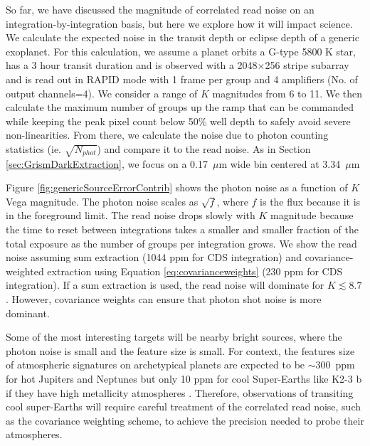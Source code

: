 \documentclass[]{aastex62}
\begin{document}
So far, we have discussed the magnitude of correlated read noise on an integration-by-integration basis, but here we explore how it will impact science.
We calculate the expected noise in the transit depth or eclipse depth of a generic exoplanet.
For this calculation, we assume a planet orbits a G-type 5800 K star, has a 3 hour transit duration and is observed with a 2048$\times$256 stripe subarray and is read out in RAPID mode with 1 frame per group and 4 amplifiers (No. of output channels=4).
We consider a range of $K$ magnitudes from 6 to 11.
We then calculate the maximum number of groups up the ramp that can be commanded while keeping the peak pixel count below 50\% well depth to safely avoid severe non-linearities.
From there, we calculate the noise due to photon counting statistics (ie. $\sqrt{N_{phot}}$) and compare it to the read noise.
As in Section \ref{sec:GrismDarkExtraction}, we focus on a 0.17~$\mu$m wide bin centered at 3.34~$\mu$m

Figure \ref{fig:genericSourceErrorContrib} shows the photon noise as a function of $K$ Vega magnitude.
The photon noise scales as $\sqrt{f}$, where $f$ is the flux because it is in the foreground limit.
The read noise drops slowly with $K$ magnitude because the time to reset between integrations takes a smaller and smaller fraction of the total exposure as the number of groups per integration grows.
We show the read noise assuming sum extraction (1044 ppm for CDS integration) and covariance-weighted extraction using Equation \ref{eq:covarianceweights} (230 ppm for CDS integration).
If a sum extraction is used, the read noise will dominate for $K \lesssim 8.7$.
However, covariance weights can ensure that photon shot noise is more dominant.

Some of the most interesting targets will be nearby bright sources, where the photon noise is small and the feature size is small.
For context, the features size of atmospheric signatures on archetypical planets are expected to be $\sim$300~ppm for hot Jupiters and Neptunes but only 10 ppm for cool Super-Earths like K2-3 b if they have high metallicity atmospheres \citep{greene2016jwst_trans}.
Therefore, observations of transiting cool super-Earths will require careful treatment of the correlated read noise, such as the covariance weighting scheme, to achieve the precision needed to probe their atmospheres.
\end{document}

